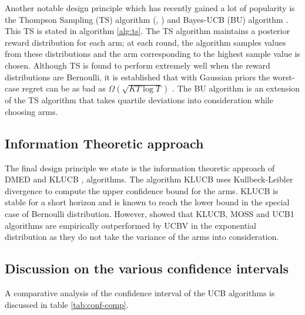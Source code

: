     
    Another notable design principle which has recently gained a lot of popularity is the Thompson Sampling (TS) algorithm (\citep{thompson1933likelihood}, \citep{agrawal2011analysis})  and  Bayes-UCB (BU) algorithm \citep{kaufmann2012bayesian}. This TS is stated in algorithm \ref{alg:ts}. The TS algorithm maintains a posterior reward distribution for each arm; at each round, the algorithm samples values from these distributions and the arm corresponding to the highest sample value is chosen. Although TS is found to perform extremely well when the reward distributions are Bernoulli, it is established that with Gaussian priors the worst-case regret can be as bad as $\Omega \left( \sqrt{KT\log T}\right)$ \citep{lattimore2015optimally}. The BU algorithm is an extension of the TS algorithm that takes quartile deviations into consideration while choosing arms.

\subsection{Information Theoretic approach}
    
    The final design principle we state is the information theoretic approach of DMED  \citep{honda2010asymptotically} and KLUCB \citep{garivier2011kl},\citep{cappe2013kullback} algorithms. The algorithm KLUCB uses Kullbeck-Leibler divergence to compute the upper confidence bound for the arms. KLUCB is stable for a short horizon and is known to reach the \citet{lai1985asymptotically} lower bound in the special case of Bernoulli distribution. However, \citet{garivier2011kl} showed that KLUCB, MOSS and UCB1 algorithms are empirically outperformed by UCBV in the exponential distribution as they do not take the variance of the arms into consideration.
    
\subsection{Discussion on the various confidence intervals}

A comparative analysis of the confidence interval of the UCB algorithms is discussed in table \ref{tab:conf-comp}.

